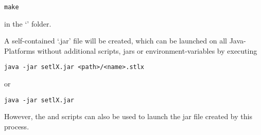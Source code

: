\begin{lstlisting}[frame=none,numbers=none]
make
\end{lstlisting}

in the `' folder.

A self-contained `.jar' file will be created, which can be launched on all Java-Platforms without additional scripts, jars or environment-variables by executing

\begin{lstlisting}[frame=none,numbers=none]
java -jar setlX.jar <path>/<name>.stlx
\end{lstlisting}

or

\begin{lstlisting}[frame=none,numbers=none]
java -jar setlX.jar
\end{lstlisting}

However, the  and  scripts can also be used to launch the jar file created by this process.

